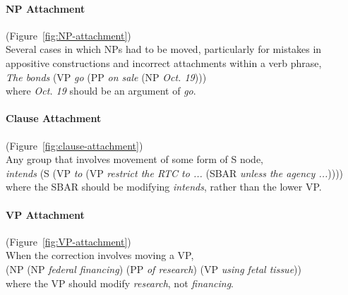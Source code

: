 \paragraph{NP Attachment} (Figure~\ref{fig:NP-attachment}) \\
Several cases in which NPs had to be moved, particularly for mistakes in appositive constructions and incorrect attachments within a verb phrase, \myeg \\
\emph{The bonds} (VP \emph{go} (PP \emph{on sale} (NP \emph{Oct.\@\xspace 19}))) \\
where \emph{Oct.\@\xspace 19} should be an argument of \emph{go}.

\paragraph{Clause Attachment} (Figure~\ref{fig:clause-attachment}) \\
Any group that involves movement of some form of S node, \myeg \\
\emph{intends} (S (VP \emph{to} (VP \emph{restrict the RTC to ...\@\xspace} (SBAR \emph{unless the agency ...\@\xspace})))) \\
where the SBAR should be modifying \emph{intends}, rather than the lower VP.

\begin{landscape}
\begin{figure}
\centering
\begin{minipage}[b]{3.5in}
\centering

\end{minipage}\hfill
\begin{minipage}[b]{4.5in}
\centering

\end{minipage}
\end{figure}
\end{landscape}

\begin{figure}
\centering

\end{figure}

\paragraph{VP Attachment} (Figure~\ref{fig:VP-attachment}) \\
When the correction involves moving a VP, \myeg \\
(NP (NP \emph{federal financing}) (PP \emph{of research}) (VP \emph{using fetal tissue})) \\
where the VP should modify \emph{research}, not \emph{financing}.

